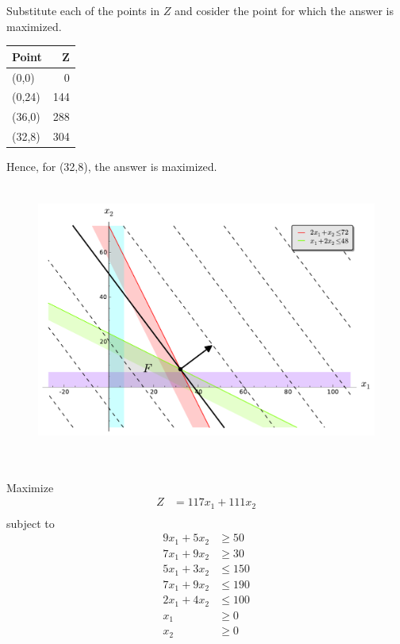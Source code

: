 \documentclass[12pt]{article}
\begin{document}
Substitute each of the points in $Z$ and cosider the point for which the answer is maximized.

\begin{center}
\begin{tabular}{|l|r|}
\hline
 Point   &    Z  \\
\hline
 (0,0)   &    0  \\
 (0,24)  &  144  \\
 (36,0)  &  288  \\
 (32,8)  &  304  \\
\hline
\end{tabular}
\end{center}



Hence, for (32,8), the answer is maximized.

  \begin{figure}[H]
    \centering
\includegraphics[height=3.5in]{./images/p3_1.pdf}
  \end{figure}
  
\newpage
\subsection{}

Maximize 
\begin{align*}
Z           & = 117 x_1 + 111 x_2 \\
\end{align*}
subject to
\begin{align*}
9 x_1+5 x_2 & \ge 50              \\
7 x_1+9 x_2 & \ge 30              \\
5 x_1+3 x_2 & \le 150             \\
7 x_1+9 x_2 & \le 190             \\
2 x_1+4 x_2 & \le 100             \\
x_1         & \ge 0               \\
x_2         & \ge 0
\end{align*}
\end{document}
